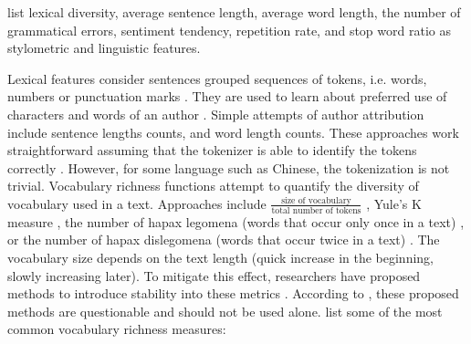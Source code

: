 \citet{bevendorff_overview_2024} list lexical diversity, average sentence length, average word length, 
the number of grammatical errors, sentiment tendency, repetition rate, and stop word ratio as 
stylometric and linguistic features.

Lexical features consider sentences grouped sequences of tokens, i.e. words, numbers or punctuation marks \citep{bevendorff_overview_2024}.
They are used to learn about preferred use of characters and words of an author \citep{elmanarelbouanani_authorship_2014}.
Simple attempts of author attribution include sentence lengths counts, and word length counts.
These approaches work straightforward assuming that the tokenizer is able to identify the tokens correctly \citep{bevendorff_overview_2024,elmanarelbouanani_authorship_2014}.
However, for some language such as Chinese, the tokenization is not trivial.
Vocabulary richness functions attempt to quantify the diversity of vocabulary used in a text.
Approaches include $\frac{\text{size of vocabulary}}{\text{total number of tokens}}$ \citep{elmanarelbouanani_authorship_2014,bevendorff_overview_2024},
Yule's K measure \citep{elmanarelbouanani_authorship_2014},
the number of hapax legomena (words that occur only once in a text) \citep{elmanarelbouanani_authorship_2014,bevendorff_overview_2024,weerasinghe_feature_vector_difference_2021}, 
or the number of hapax dislegomena (words that occur twice in a text) \citep{elmanarelbouanani_authorship_2014,weerasinghe_feature_vector_difference_2021}.
The vocabulary size depends on the text length (quick increase in the beginning, slowly increasing later).
To mitigate this effect, researchers have proposed methods to introduce stability into these metrics \citep{elmanarelbouanani_authorship_2014,bevendorff_overview_2024}. 
According to \citet{stamatatos_survey_2009}, these proposed methods are questionable and should not be used alone.
\citet{neal_surveying_2018} list some of the most common vocabulary richness measures:
